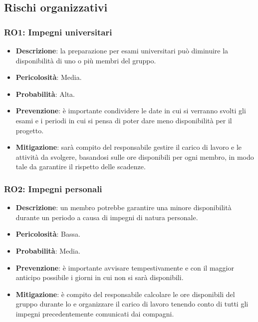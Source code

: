 \subsection{Rischi organizzativi}

\subsubsection{RO1: Impegni universitari}
\begin{itemize}
    \item \textbf{Descrizione}: la preparazione per esami universitari può diminuire la disponibilità di uno o più membri del gruppo.
    \item \textbf{Pericolosità}: Media.
    \item \textbf{Probabilità}: Alta.
    \item \textbf{Prevenzione}: è importante condividere le date in cui si verranno svolti gli esami e i periodi in cui si pensa di poter dare meno disponibilità per il progetto.
    \item \textbf{Mitigazione}: sarà compito del responsabile gestire il carico di lavoro e le attività da svolgere, basandosi sulle ore disponibili per ogni membro, in modo tale da garantire il rispetto delle scadenze. 
\end{itemize}

\subsubsection{RO2: Impegni personali}
\begin{itemize}
    \item \textbf{Descrizione}: un membro potrebbe garantire una minore disponibilità durante un periodo a causa di impegni di natura personale.
    \item \textbf{Pericolosità}: Bassa.
    \item \textbf{Probabilità}: Media.
    \item \textbf{Prevenzione}: è importante avvisare tempestivamente e con il maggior anticipo possibile i giorni in cui non si sarà disponibili. 
    \item \textbf{Mitigazione}: è compito del responsabile calcolare le ore disponibili del gruppo durante lo  e organizzare il carico di lavoro tenendo conto di tutti gli impegni precedentemente comunicati dai compagni. 
\end{itemize}

